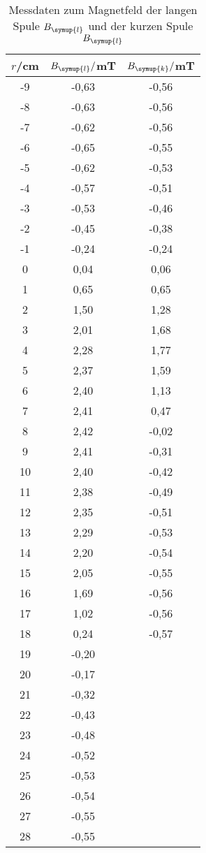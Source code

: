 \begin{table}
  \centering
    \caption{Messdaten zum Magnetfeld der langen Spule $B_{\symup{l}}$ und der
    kurzen Spule $B_{\symup{l}}$}
    \label{tab:einzelne_spulen}
    \begin{tabular}{c c c}
      \toprule
      $r$/cm & $B_{\symup{l}}/$mT & $B_{\symup{k}}/$mT\\
      \midrule
      -9	&  -0,63 &	  -0,56\\
      -8	&  -0,63 &	  -0,56\\
      -7	&  -0,62 &	  -0,56\\
      -6	&  -0,65 &	  -0,55\\
      -5	&  -0,62 &	  -0,53\\
      -4	&  -0,57 &	  -0,51\\
      -3	&  -0,53 &  -0,46\\
      -2	&  -0,45 &  -0,38\\
      -1	&  -0,24 &   -0,24\\
      0	  &  0,04 &    0,06\\
      1	  &  0,65 &   0,65\\
      2	  &  1,50 &   1,28\\
      3	  &  2,01 &   1,68\\
      4	  &  2,28 &   1,77\\
      5	  &  2,37 &   1,59\\
      6   &  2,40 &   1,13\\
      7	  &  2,41 &   0,47\\
      8	  &  2,42 &  -0,02\\
      9	  &  2,41 &  -0,31\\
      10	&  2,40  &  -0,42\\
      11	&  2,38  &  -0,49\\
      12	&  2,35  &  -0,51\\
      13	&  2,29  &  -0,53\\
      14	&  2,20  &  -0,54\\
      15	&  2,05  &  -0,55\\
      16	&  1,69  &  -0,56\\
      17	&  1,02  &  -0,56\\
      18  &  0,24  &  -0,57\\
      19	&  -0,20 \\
      20	&  -0,17 \\
      21	&  -0,32 \\
      22	&  -0,43 \\
      23	&  -0,48 \\
      24	&  -0,52 \\
      25	&  -0,53 \\
      26	&  -0,54 \\
      27	&  -0,55 \\
      28	&  -0,55 \\
      \bottomrule
    \end{tabular}
\end{table}

